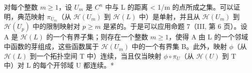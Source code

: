 对每个整数 \(m \geqslant 1\)，设 \(U_{m}\) 是 \(C^{n}\) 中与 L 的距离 \textless{} 1/m 的点所成之集。可以证明，典范映射 \(\pi_{U_{m}}\)（从 \(\mathcal{H}(U_{m})\) 到 \(\mathcal{H}(L)\) 中）是单射，并且从 \(\mathcal{H}(U_{m})\) 到 \(\mathcal{H}(U_{p})\) 中的限制映射对 \(p \geqslant m\) 是紧的。于是可以应用命题 7（III, 第 6 页）。设 A 是 \(\mathcal{H}(L)\) 的一个有界子集；则存在一个整数 \(m \geqslant 1\)，使得 A 由 L 的一个邻域中函数的芽组成，这些函数属于 \(\mathcal{H}(U_{m})\) 中的一个有界集 B。此外，映射 \(\phi\)（从 \(\mathcal{H}(L)\) 到一个拓扑空间 T 中）连续，当且仅当映射 \(\phi \circ \pi_{U}\)（从 \(\mathcal{H}(U)\) 到 T 中）对 L 的每个开邻域 U 都连续。*

